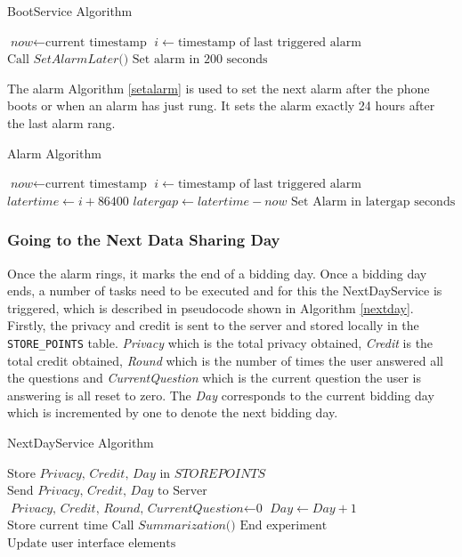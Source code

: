 \begin{algorithm}
\caption{BootService Algorithm}\label{boot}
\begin{algorithmic}[1]
\State $\textit{now} \gets \text{current timestamp}$
\State $i \gets \text{timestamp of last triggered alarm}$
  \State $\text{Call }\textit{SetAlarmLater()}$
\Else
  \State $\text{Set alarm in 200 seconds}$
\EndIf
\EndProcedure
\end{algorithmic}
\end{algorithm}

The alarm Algorithm \ref{setalarm} is used to set the next alarm after the phone boots or when an alarm has just rung. It sets the alarm exactly 24 hours after the last alarm rang.

\begin{algorithm}
\caption{Alarm Algorithm}\label{setalarm}
\begin{algorithmic}[1]
\State $\textit{now} \gets \text{current timestamp}$
\State $i \gets \text{timestamp of last triggered alarm}$
\State $\textit{latertime} \gets \textit{i}+\text{86400}$
\State $\textit{latergap} \gets \textit{latertime}-\textit{now}$
\State $\text{Set Alarm in latergap seconds}$
\EndProcedure
\end{algorithmic}
\end{algorithm}

\subsubsection{Going to the Next Data Sharing Day} \label{next}
Once the alarm rings, it marks the end of a bidding day. Once a bidding day ends, a number of tasks need to be executed
and for this the NextDayService is triggered, which is described in pseudocode shown in Algorithm \ref{nextday}. Firstly, the privacy and credit is sent to the server and stored locally in the \texttt{STORE\_POINTS} table. \textit{Privacy} which is the total privacy obtained, \textit{Credit} is the total credit obtained, \textit{Round} which is the number of times the user answered all the questions and \textit{CurrentQuestion} which is the current question the user is answering is all reset to zero. The \textit{Day} corresponds to the current bidding day which is incremented by one to denote the next bidding day.

\begin{algorithm}
\caption{NextDayService Algorithm}\label{nextday}
\begin{algorithmic}[1]
\State $\text{Store }\textit{Privacy, Credit, Day } \text{in } \textit{STOREPOINTS}$
\State $\text{Send }\textit{Privacy, Credit, Day } \text{to Server}$
\State $\textit{Privacy, Credit, Round, CurrentQuestion} \gets \text{0}$
\State $\textit{Day} \gets \textit{Day}+1$
\State $\text{Store current time}$
\State $\text{Call }\textit{Summarization()}$
  \State $\text{End experiment}$
\Else
  \State $\text{Update user interface elements}$ 
\EndIf
\EndProcedure
\end{algorithmic}
\end{algorithm}

